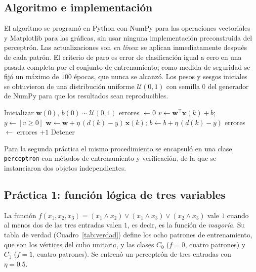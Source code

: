 \documentclass[conference]{IEEEtran}
\begin{document}
\subsection{Algoritmo e implementación}
El algoritmo se programó en Python con NumPy para las operaciones vectoriales
y Matplotlib para las gráficas, sin usar ninguna implementación preconstruida
del perceptrón. Las actualizaciones son \emph{en línea}: se aplican
inmediatamente después de cada patrón. El criterio de paro es error de
clasificación igual a cero en una pasada completa por el conjunto de
entrenamiento; como medida de seguridad se fijó un máximo de $100$ épocas,
que nunca se alcanzó. Los pesos y sesgos iniciales se obtuvieron de una
distribución uniforme $\mathcal{U}(0,1)$ con semilla $0$ del generador de
NumPy para que los resultados sean reproducibles.
\begin{algorithmic}[1]
\STATE Inicializar $\mathbf{w}(0)$, $b(0)\sim\mathcal{U}(0,1)$
    \STATE errores $\leftarrow 0$
        \STATE $v\leftarrow\mathbf{w}^\top\mathbf{x}(k)+b$;\quad $y\leftarrow[v\geq0]$
            \STATE $\mathbf{w}\leftarrow\mathbf{w}+\eta\,(d(k)-y)\,\mathbf{x}(k)$;\quad
                   $b\leftarrow b+\eta\,(d(k)-y)$
            \STATE errores $\leftarrow$ errores $+1$
        \ENDIF
    \ENDFOR
     \STATE Detener \ENDIF
\ENDFOR
\end{algorithmic}
Para la segunda práctica el mismo procedimiento se encapsuló en una clase
\texttt{perceptron} con métodos de entrenamiento y verificación, de la que
se instanciaron dos objetos independientes.

\subsection{Práctica 1: función lógica de tres variables}
La función $f(x_1,x_2,x_3)=(x_1\wedge x_2)\vee(x_1\wedge x_3)\vee(x_2\wedge x_3)$
vale $1$ cuando al menos dos de las tres entradas valen $1$, es decir, es la
función de \emph{mayoría}. Su tabla de verdad (Cuadro~\ref{tab:verdad}) define
los ocho patrones de entrenamiento, que son los vértices del cubo unitario, y
las clases $C_0$ ($f=0$, cuatro patrones) y $C_1$ ($f=1$, cuatro patrones).
Se entrenó un perceptrón de tres entradas con $\eta=0.5$.
\end{document}
